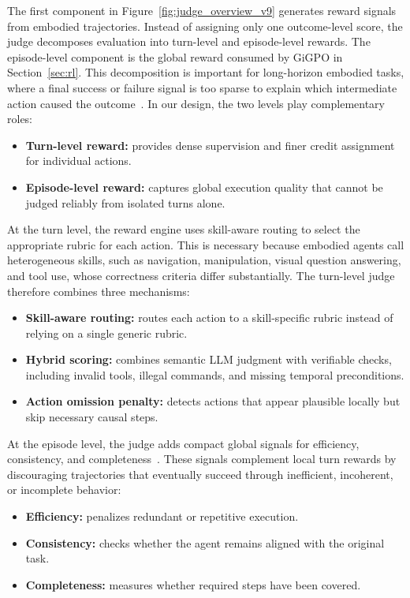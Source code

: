 The first component in Figure~\ref{fig:judge_overview_v9} generates reward signals from embodied trajectories. Instead of assigning only one outcome-level score, the judge decomposes evaluation into turn-level and episode-level rewards. The episode-level component is the global reward consumed by GiGPO in Section~\ref{sec:rl}. This decomposition is important for long-horizon embodied tasks, where a final success or failure signal is too sparse to explain which intermediate action caused the outcome~\citep{wei2025reinforcing}. In our design, the two levels play complementary roles:
\begin{itemize}
    \item \textbf{Turn-level reward:} provides dense supervision and finer credit assignment for individual actions.
    \item \textbf{Episode-level reward:} captures global execution quality that cannot be judged reliably from isolated turns alone.
\end{itemize}

At the turn level, the reward engine uses skill-aware routing to select the appropriate rubric for each action. This is necessary because embodied agents call heterogeneous skills, such as navigation, manipulation, visual question answering, and tool use, whose correctness criteria differ substantially. The turn-level judge therefore combines three mechanisms:
\begin{itemize}
    \item \textbf{Skill-aware routing:} routes each action to a skill-specific rubric instead of relying on a single generic rubric.
    \item \textbf{Hybrid scoring:} combines semantic LLM judgment with verifiable checks, including invalid tools, illegal commands, and missing temporal preconditions.
    \item \textbf{Action omission penalty:} detects actions that appear plausible locally but skip necessary causal steps.
\end{itemize}

At the episode level, the judge adds compact global signals for efficiency, consistency, and completeness~\citep{han2026swetrace}. These signals complement local turn rewards by discouraging trajectories that eventually succeed through inefficient, incoherent, or incomplete behavior:
\begin{itemize}
    \item \textbf{Efficiency:} penalizes redundant or repetitive execution.
    \item \textbf{Consistency:} checks whether the agent remains aligned with the original task.
    \item \textbf{Completeness:} measures whether required steps have been covered.
\end{itemize}

